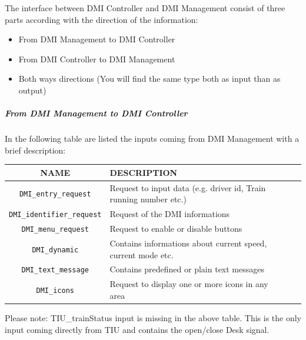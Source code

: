   The interface between DMI Controller and DMI Management consist of three parts according with the direction of the information:
  
  \begin{itemize}
  \item From DMI Management to DMI Controller
  \item From DMI Controller to DMI Management 
  \item Both ways directions (You will find the same type both as input than as output)
  \end{itemize}
  


\subparagraph{From DMI Management to DMI Controller}

In the following table are listed the inputs coming from DMI Management with a brief description:\\
    \begin{tabular}{| c | l | l | l | l |}
      \hline
      \textbf{NAME} & \textbf{DESCRIPTION} \\ \hline
      \texttt{DMI\_entry\_request} & Request to input data (e.g. driver id, Train running number etc.)\\
      \texttt{DMI\_identifier\_request} & Request of the DMI informations\\
      \texttt{DMI\_menu\_request} & Request to enable or disable buttons\\
      \texttt{DMI\_dynamic} & Contains informations about current speed, current mode etc.\\
      \texttt{DMI\_text\_message} & Contains predefined or plain text messages\\
      \texttt{DMI\_icons} & Request to display one or more icons in any area\\

      \hline
    \end{tabular} 
    \label{tbl:DMICtrToDMIMng}
  
      Please note: TIU\_trainStatus input is missing in the above table. This is the only input coming directly from TIU and contains the open/close Desk signal. 
    
